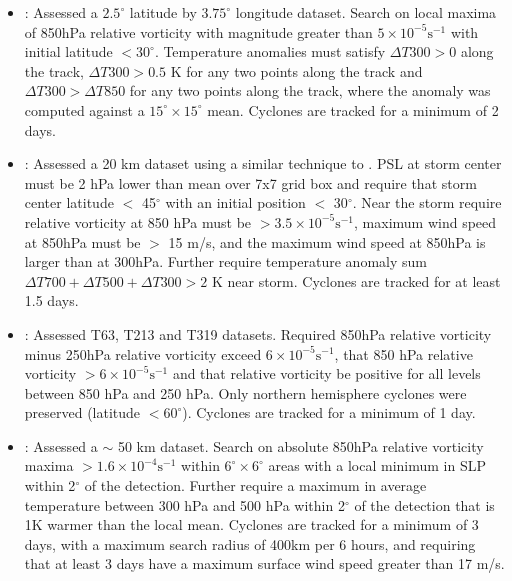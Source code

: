 \documentclass[gmdd, hvmath, online]{copernicus_discussions}
\begin{document}
\begin{itemize}
\item \cite{mcdonald2005tropical}:  Assessed a $2.5^\circ$ latitude by $3.75^\circ$ longitude dataset.  Search on local maxima of 850hPa relative vorticity with magnitude greater than $5 \times 10^{-5} \mbox{s}^{-1}$ with initial latitude $< 30^\circ$.  Temperature anomalies must satisfy $\Delta T300 > 0$ along the track, $\Delta T300 > 0.5$ K for any two points along the track and $\Delta T300 > \Delta T850$ for any two points along the track, where the anomaly was computed against a $15^\circ \times 15^\circ$ mean.  Cyclones are tracked for a minimum of 2 days.

\item \cite{oouchi2006tropical}:  Assessed a 20 km dataset using a similar technique to \cite{sugi2002influence}.  PSL at storm center must be 2 hPa lower than mean over 7x7 grid box and require that storm center latitude $<$ 45$^\circ$ with an initial position $<$ 30$^\circ$.  Near the storm require relative vorticity at 850 hPa must be $> 3.5 \times 10^{-5} \mbox{s}^{-1}$, maximum wind speed at 850hPa must be $>$ 15 m/s, and the maximum wind speed at 850hPa is larger than at 300hPa.  Further require temperature anomaly sum $\Delta T700+ \Delta T500+ \Delta T300 > 2$ K near storm.  Cyclones are tracked for at least 1.5 days.

\item \cite{bengtsson2007how}:  Assessed T63, T213 and T319 datasets.  Required 850hPa relative vorticity minus 250hPa relative vorticity exceed $6 \times 10^{-5} \mbox{s}^{-1}$, that 850 hPa relative vorticity $> 6 \times 10^{-5} \mbox{s}^{-1}$ and that relative vorticity be positive for all levels between 850 hPa and 250 hPa.  Only northern hemisphere cyclones were preserved (latitude $< 60^\circ$).  Cyclones are tracked for a minimum of 1 day.

\item \cite{knutson2007simulation, zhao2009simulations}:  Assessed a $\sim$ 50 km dataset.  Search on absolute 850hPa relative vorticity maxima $> 1.6 \times 10^{-4} \mbox{s}^{-1}$ within $6^\circ \times 6^\circ$ areas with a local minimum in SLP within 2$^\circ$ of the detection.  Further require a maximum in average temperature between 300 hPa and 500 hPa within 2$^\circ$ of the detection that is 1K warmer than the local mean.  Cyclones are tracked for a minimum of 3 days, with a maximum search radius of 400km per 6 hours, and requiring that at least 3 days have a maximum surface wind speed greater than 17 m/s.


\end{itemize}
\end{document}
